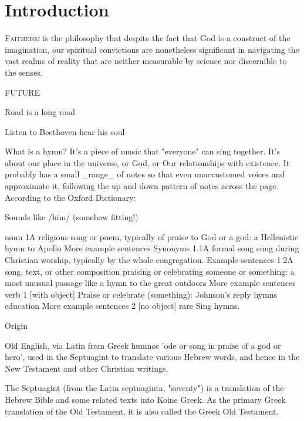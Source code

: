 \documentclass[a5paper,twoside,9pt]{extbook}
\begin{document}
\tableofcontents
\chapter{Introduction}

\lettrine{F}{aitheism} is the philosophy that despite the fact that God is a construct of the imagination, our spiritual convictions are nonetheless significant in navigating the vast realms of reality that are neither measurable by science nor discernible to the senses.

FUTURE

Road is a long road

Listen to Beethoven hear his soul

What is a hymn? It's a piece of music that "everyone" can sing together. It's about our place in the universe, or God, or Our relationships with existence. It probably has a small _range_ of notes so that even unaccustomed voices and approximate it, following the up and down pattern of notes across the page. According to the Oxford Dictionary:

Sounds like /him/ (somehow fitting!)

noun
1A religious song or poem, typically of praise to God or a god: a Hellenistic hymn to Apollo
More example sentences Synonyms
1.1A formal song sung during Christian worship, typically by the whole congregation.
Example sentences
1.2A song, text, or other composition praising or celebrating someone or something: a most unusual passage like a hymn to the great outdoors
More example sentences
verb
1 [with object] Praise or celebrate (something): Johnson’s reply hymns education
More example sentences
2 [no object] rare Sing hymns.

Origin

Old English, via Latin from Greek humnos 'ode or song in praise of a god or hero', used in the Septuagint to translate various Hebrew words, and hence in the New Testament and other Christian writings.

The Septuagint (from the Latin septuaginta, "seventy") is a translation of the Hebrew Bible and some related texts into Koine Greek. As the primary Greek translation of the Old Testament, it is also called the Greek Old Testament.
\end{document}
